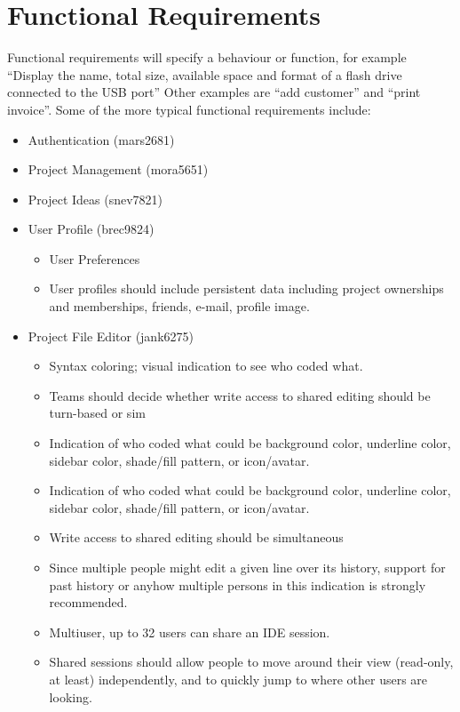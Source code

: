 \documentclass[11pt]{report}
\begin{document}
\section{Functional Requirements}
    Functional requirements will specify a behaviour or function, for example ``Display the name, total size, available space and format of a flash drive connected to the USB port'' Other examples are ``add customer'' and ``print invoice''. Some of the more typical functional requirements include:
    \begin{itemize}
        \item Authentication (mars2681)
        \item Project Management (mora5651)
        \item Project Ideas (snev7821)
        \item User Profile (brec9824) \begin{itemize}
            \item User Preferences
            \item User profiles should include persistent data including project ownerships and  memberships, friends, e-mail, profile image. 
            \end{itemize}
        \item Project File Editor (jank6275) \begin{itemize}
            \item Syntax coloring; visual indication to see who coded what. 
            \item Teams should decide whether write access to shared editing should be turn-based or sim
            \item Indication of who coded what could be background color, underline color, sidebar color, shade/fill pattern, or icon/avatar. 
            \item Indication of who coded what could be background color, underline color, sidebar color, shade/fill pattern, or icon/avatar. 
            \item Write access to shared editing should be simultaneous
            \item Since multiple people might edit a given line over its history, support for past history or anyhow multiple persons in this indication is strongly recommended.    
            \item Multiuser, up to 32 users can share an IDE session.
            \item Shared sessions should allow people to move around their view (read-only, at least) independently, and to quickly jump to where other users are looking. \end{itemize}

\end{itemize}
\end{document}
